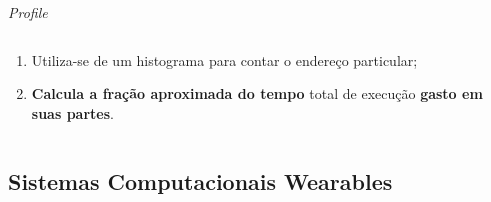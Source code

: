 \begin{frame}{\textit{Profile}}
\begin{columns}
\begin{column}{0.5\textwidth}
\begin{itemize}
\begin{enumerate}
                     \item Utiliza-se de um histograma para contar o endereço particular;
                     
                     \item \textbf{Calcula a fração aproximada do tempo} total de execução \textbf{gasto em suas partes}. 
                  \end{enumerate}
               \end{itemize}
            
            \end{column}
         \end{columns}
         
      \end{frame}


   \subsection{Sistemas Computacionais Wearables}


